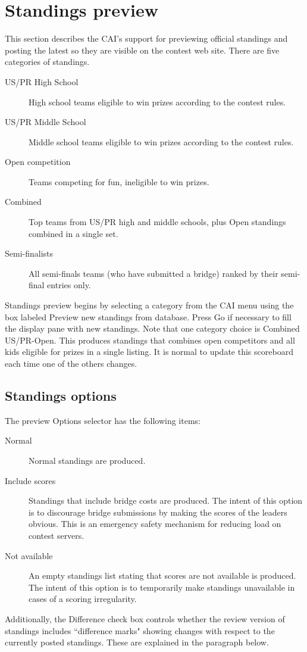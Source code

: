 \documentclass[11pt,letterpaper]{refart}
\def\ui#1{\textsf{#1}}
\begin{document}
\section{Standings preview}
This section describes the CAI's support for previewing official standings and posting
the latest so they are visible on the contest web site. There are five categories of
standings.
\begin{description}
\item[US/PR High School] High school teams eligible to win prizes according to the contest rules.
\item[US/PR Middle School] Middle school teams eligible to win prizes according to the contest rules.
\item[Open competition] Teams competing for fun, ineligible to win prizes.
\item[Combined] Top teams from US/PR high and middle schools, plus 
Open standings combined in a single set. 
\item[Semi-finalists] All semi-finals teams (who have submitted a bridge) ranked
by their semi-final entries only.
\end{description}

Standings preview begins by selecting a category from the CAI menu using the box labeled
\ui{Preview new standings from database}. Press \ui{Go} if necessary to fill
the display pane with new standings. Note that one category choice is 
\ui{Combined US/PR-Open}. This produces standings that combines open competitors and
all kids eligible for prizes in a single listing. It is normal to update this
scoreboard each time one of the others changes.

\subsection{Standings options}
The preview \ui{Options} selector has the following items:
\begin{description}
\item[Normal] Normal standings are produced.
\item[Include scores] Standings that include bridge costs are produced. The intent of this
option is to discourage bridge submissions by making the scores of the leaders obvious. This is an
emergency safety mechanism for reducing load on contest servers.
\item[Not available] An empty standings list stating that scores are not available is produced.
The intent of this option is to temporarily make standings unavailable in cases of a scoring
irregularity.
\end{description} 
Additionally, the \ui{Difference} check box controls whether the review version of standings
includes ``difference marks" showing changes with respect to the currently posted standings.
These are explained in the paragraph below.
\end{document}
